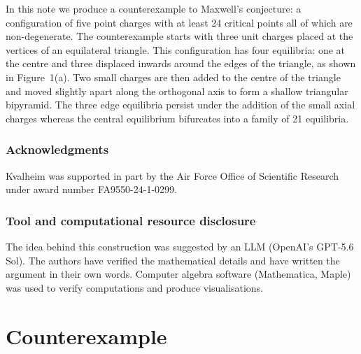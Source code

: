 \documentclass[12pt,a4paper]{article}
\theoremstyle{plain}
\theoremstyle{definition}
\begin{document}
	In this note we produce a counterexample to Maxwell's conjecture: a configuration of five point charges with at least 24 critical points all of which are non-degenerate. The counterexample starts with three unit charges placed at the vertices of an equilateral triangle. This configuration has four equilibria: one at the centre and three displaced inwards around the edges of the triangle, as shown in Figure~1(a). Two small charges are then added to the centre of the triangle and moved slightly apart along the orthogonal axis to form a shallow triangular bipyramid. The three edge equilibria persist under the addition of the small axial charges whereas the central equilibrium bifurcates into a family of 21 equilibria. 
	
	
	\subsubsection*{Acknowledgments} Kvalheim was supported in part by the Air Force Office of Scientific Research under award number FA9550-24-1-0299.
	
	\subsubsection*{Tool and computational resource disclosure} The idea behind this construction was suggested by an LLM (OpenAI's GPT-5.6 Sol). The authors have verified the mathematical details and have written the argument in their own words. Computer algebra software (Mathematica, Maple) was used to verify computations and produce visualisations.
	
	\section{Counterexample}
	
\end{document}
